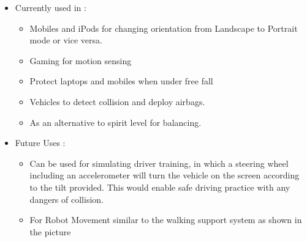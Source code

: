 \documentclass[a4paper,12 pt]{article}
\begin{document}
\begin{itemize}
\item Currently used in :
\begin{itemize}
\item Mobiles and iPods for changing orientation from Landscape to Portrait mode or vice versa.
\item Gaming for motion sensing
\item Protect laptops and mobiles when under free fall
\item Vehicles to detect collision and deploy airbags.
\item As an alternative to spirit level for balancing.
\end{itemize}
\item Future Uses :

\begin{itemize}
\item Can be used for simulating driver training, in which a steering wheel including an accelerometer will turn the vehicle on the screen according to the tilt provided. This would enable safe driving practice with any dangers of collision.
\item For Robot Movement similar to the walking support system as shown in the picture 


\end{itemize}
\end{itemize}
\end{document}

